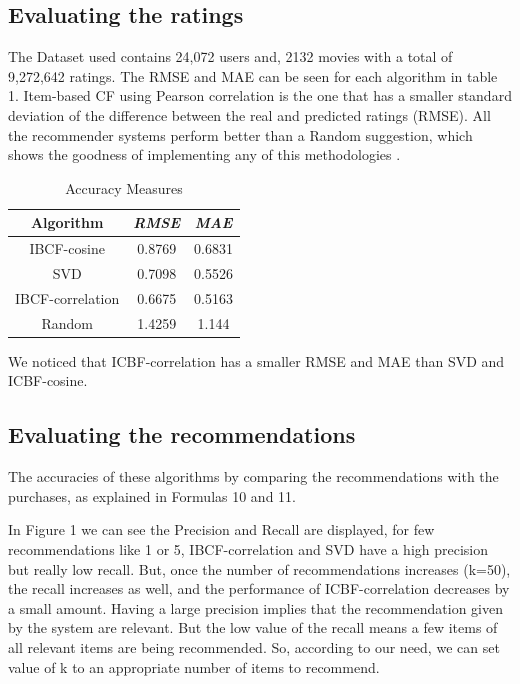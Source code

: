 \documentclass[conference]{IEEEtran}
\begin{document}
\subsection{Evaluating the ratings}\label{BB}
The Dataset used contains 24,072 users and, 2132 movies with a total of
9,272,642 ratings. The RMSE and MAE can be seen for each algorithm in table 1. Item-based CF using Pearson correlation is the one that has a smaller standard deviation of the difference between the real and predicted ratings (RMSE). All the recommender systems perform better than a Random suggestion, which shows the goodness of implementing any of this methodologies \cite{b13}.

\begin{table}[htbp]
\caption{Accuracy Measures}
\begin{center}
\begin{tabular}{|c|c|c|}
\hline
\textbf{Algorithm} & \textbf{\textit{RMSE}}& \textbf{\textit{MAE}} \\
\hline
IBCF-cosine & 0.8769 & 0.6831 \\
\hline
SVD & 0.7098 & 0.5526 \\
\hline
IBCF-correlation & 0.6675 & 0.5163 \\
\hline
Random & 1.4259 & 1.144 \\
\hline
\end{tabular}
\label{tab1}
\end{center}
\end{table}

We noticed that ICBF-correlation has a smaller RMSE and MAE than SVD and ICBF-cosine.

\subsection{ Evaluating the recommendations}
The accuracies of these algorithms by comparing the recommendations with the purchases, as explained in Formulas 10 and 11.

In Figure 1 we can see the Precision and Recall are displayed, for few recommendations like 1 or 5, IBCF-correlation and SVD have a high precision but really low recall. But, once the number of recommendations increases (k=50), the recall increases as well, and the performance of ICBF-correlation decreases by a small amount. Having a large precision implies that the recommendation given by the system are relevant. But the low value of the recall means a few items of all relevant items are being recommended. So, according to our need, we can set value of k to an appropriate number of items to recommend.
\end{document}
